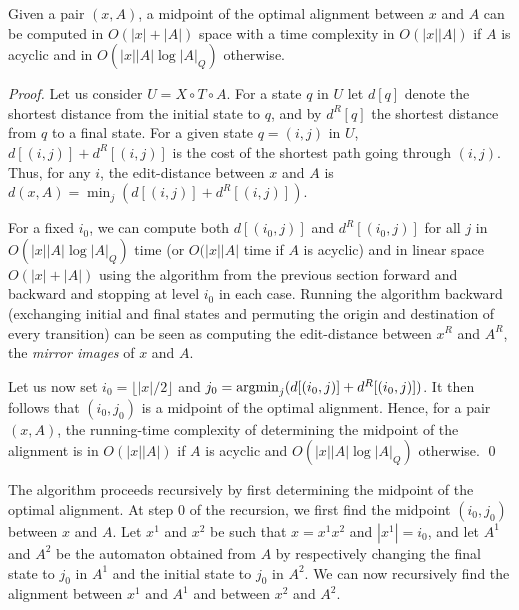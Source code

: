 \documentclass{llncs}
\def\argmin{\mathop{\rm argmin}}
\newcommand{\0}{\overline{0}}
\newcommand{\1}{\overline{1}}
\newcommand{\+}{\oplus}
\renewcommand{\.}{\otimes}
\newcommand{\floor}[1]{\lfloor #1 \rfloor}
\begin{document}
\begin{lemma}
Given a pair $(x, A)$, a midpoint of the optimal alignment between $x$
and $A$ can be computed in $O(|x| + |A|)$ space with a time complexity in
$O(|x| |A|)$ if $A$ is acyclic and in $O(|x| |A| \log |A|_Q)$
otherwise.
\end{lemma}
\begin{proof}
  Let us consider $U = X \circ T \circ A$. For a state $q$ in $U$ let
  $d[q]$ denote the shortest distance from the initial state to $q$,
  and by $d^R[q]$ the shortest distance from $q$ to a final state.
  For a given state $q = (i,j)$ in $U$, $d[(i,j)] + d^R[(i,j)]$ is the
  cost of the shortest path going through $(i,j)$.  Thus, for any $i$,
  the edit-distance between $x$ and $A$ is $d(x, A) = \min_{j}
  (d[(i,j)] + d^R[(i,j)])$.

  For a fixed $i_0$, we can compute both $d[(i_0, j)]$ and
  $d^R[(i_0,j)]$ for all $j$ in $O(|x| |A| \log |A|_Q)$ time (or
  $O(|x| |A|$ time if $A$ is acyclic) and in linear space $O(|x|+|A|)$
  using the algorithm from the previous section forward and backward
  and stopping at level $i_0$ in each case. Running the algorithm
  backward (exchanging initial and final states and permuting the
  origin and destination of every transition) can be seen as computing
  the edit-distance between $x^R$ and $A^R$, the {\em mirror images}
  of $x$ and $A$.
 
  Let us now set $i_0 = \floor{|x|/2}$ and $j_0 = \argmin_j (d[(i_0,j)]
  + d^R[(i_0,j)])$. It then follows that $(i_0, j_0)$ is a midpoint of
  the optimal alignment. Hence, for a pair $(x, A)$, the running-time
  complexity of determining the midpoint of the alignment is in $O(|x|
  |A|)$ if $A$ is acyclic and $O(|x| |A| \log |A|_Q)$ otherwise. \qed
\end{proof}

The algorithm proceeds recursively by first determining the midpoint
of the optimal alignment.  At step 0 of the recursion, we first find
the midpoint $(i_0,j_0)$ between $x$ and $A$. Let $x^1$ and $x^2$ be
such that $x = x^1 x^2$ and $|x^1| = i_0$, and let $A^1$ and $A^2$ be
the automaton obtained from $A$ by respectively changing the final
state to $j_0$ in $A^1$ and the initial state to $j_0$ in $A^2$. We
can now recursively find the alignment between $x^1$ and $A^1$ and
between $x^2$ and $A^2$.
\end{document}
